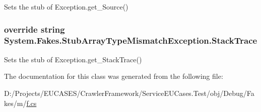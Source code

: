 Sets the stub of Exception.\-get\-\_\-\-Source()

\hypertarget{class_system_1_1_fakes_1_1_stub_array_type_mismatch_exception_a7865da210d3d469a5c7c0049849c0e1f}{
\subsubsection[{Stack\-Trace}]{\setlength{\rightskip}{0pt plus 5cm}override string System.\-Fakes.\-Stub\-Array\-Type\-Mismatch\-Exception.\-Stack\-Trace\hspace{0.3cm}{\ttfamily [get]}}}\label{class_system_1_1_fakes_1_1_stub_array_type_mismatch_exception_a7865da210d3d469a5c7c0049849c0e1f}


Sets the stub of Exception.\-get\-\_\-\-Stack\-Trace()



The documentation for this class was generated from the following file\-:\begin{DoxyCompactItemize}
\item 
D\-:/\-Projects/\-E\-U\-C\-A\-S\-E\-S/\-Crawler\-Framework/\-Service\-E\-U\-Cases.\-Test/obj/\-Debug/\-Fakes/m/\hyperlink{m_2f_8cs}{f.\-cs}\end{DoxyCompactItemize}
